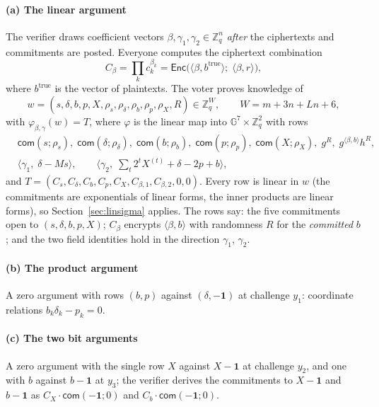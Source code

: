 \documentclass[11pt,a4paper]{article}
\newcommand{\G}{\mathbb{G}}
\newcommand{\Z}{\mathbb{Z}}
\newcommand{\Enc}{\mathsf{Enc}}
\newcommand{\com}{\mathsf{com}}
\theoremstyle{remark}
\begin{document}
\paragraph{(a) The linear argument} The verifier draws coefficient vectors
$\beta, \gamma_1, \gamma_2 \in \Z_q^n$ \emph{after} the ciphertexts and
commitments are posted. Everyone computes the ciphertext combination
\[
  C_\beta = \prod_{k} c_k^{\beta_k} = \Enc\big(\langle \beta, b^{\mathrm{true}}\rangle;\; \langle \beta, r \rangle\big),
\]
where $b^{\mathrm{true}}$ is the vector of plaintexts. The voter proves
knowledge of
\[
  w = (s, \delta, b, p, X, \rho_s, \rho_\delta, \rho_b, \rho_p, \rho_X, R)
  \in \Z_q^{W}, \qquad W = m + 3n + Ln + 6,
\]
with $\varphi_{\beta, \gamma}(w) = T$, where $\varphi$ is the linear map
into $\G^7 \times \Z_q^2$ with rows
\begin{align*}
  &\com(s; \rho_s),\; \com(\delta; \rho_\delta),\; \com(b; \rho_b),\; \com(p; \rho_p),\; \com(X; \rho_X),\;
  g^{R},\; g^{\langle \beta, b \rangle} h^{R}, \\
  &\langle \gamma_1,\; \delta - M s \rangle,\qquad
  \big\langle \gamma_2,\; \textstyle\sum_t 2^t X^{(t)} + \delta - 2p + b \big\rangle,
\end{align*}
and $T = (C_s, C_\delta, C_b, C_p, C_X, C_{\beta,1}, C_{\beta,2}, 0, 0)$.
Every row is linear in $w$ (the commitments are exponentials of linear
forms, the inner products are linear forms), so Section~\ref{sec:linsigma}
applies. The rows say: the five commitments open to $(s, \delta, b, p, X)$;
$C_\beta$ encrypts $\langle \beta, b \rangle$ with randomness $R$ for the
\emph{committed} $b$; and the two field identities hold in the direction
$\gamma_1$, $\gamma_2$.

\paragraph{(b) The product argument} A zero argument with rows $(b, p)$
against $(\delta, -\mathbf{1})$ at challenge $y_1$: coordinate relations
$b_k \delta_k - p_k = 0$.

\paragraph{(c) The two bit arguments} A zero argument with the single row
$X$ against $X - \mathbf{1}$ at challenge $y_2$, and one with $b$ against
$b - \mathbf{1}$ at $y_3$; the verifier derives the commitments to $X -
\mathbf{1}$ and $b - \mathbf{1}$ as $C_X \cdot \com(-\mathbf{1}; 0)$ and
$C_b \cdot \com(-\mathbf{1}; 0)$.
\end{document}
